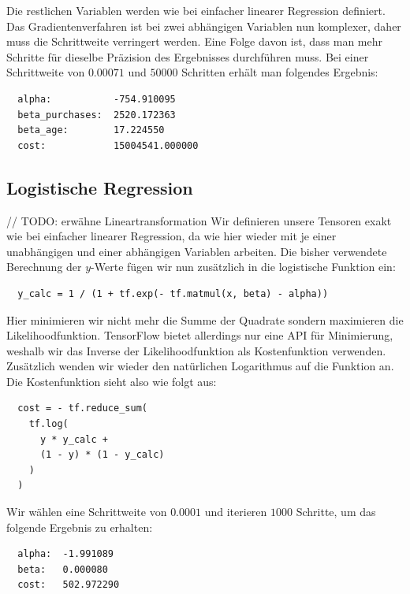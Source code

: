 Die restlichen Variablen werden wie bei einfacher linearer Regression definiert. Das Gradientenverfahren ist bei zwei abhängigen Variablen nun komplexer, daher muss die Schrittweite verringert werden. Eine Folge davon ist, dass man mehr Schritte für dieselbe Präzision des Ergebnisses durchführen muss. Bei einer Schrittweite von $0.00071$ und $50000$ Schritten erhält man folgendes Ergebnis:

\begin{verbatim}
  alpha:           -754.910095
  beta_purchases:  2520.172363
  beta_age:        17.224550
  cost:            15004541.000000
\end{verbatim}

\subsection{Logistische Regression}
\label{subsection:3:3:4}

// TODO: erwähne Lineartransformation
Wir definieren unsere Tensoren exakt wie bei einfacher linearer Regression, da wie hier wieder mit je einer unabhängigen und einer abhängigen Variablen arbeiten. Die bisher verwendete Berechnung der $y$-Werte fügen wir nun zusätzlich in die logistische Funktion ein:

\begin{verbatim}
  y_calc = 1 / (1 + tf.exp(- tf.matmul(x, beta) - alpha))
\end{verbatim}

Hier minimieren wir nicht mehr die Summe der Quadrate sondern maximieren die Likelihoodfunktion. TensorFlow bietet allerdings nur eine API für Minimierung, weshalb wir das Inverse der Likelihoodfunktion als Kostenfunktion verwenden. Zusätzlich wenden wir wieder den natürlichen Logarithmus auf die Funktion an. Die Kostenfunktion sieht also wie folgt aus:

\begin{verbatim}
  cost = - tf.reduce_sum(
    tf.log(
      y * y_calc +
      (1 - y) * (1 - y_calc)
    )
  )
\end{verbatim}

Wir wählen eine Schrittweite von $0.0001$ und iterieren $1000$ Schritte, um das folgende Ergebnis zu erhalten:

\begin{verbatim}
  alpha:  -1.991089
  beta:   0.000080
  cost:   502.972290
\end{verbatim}

